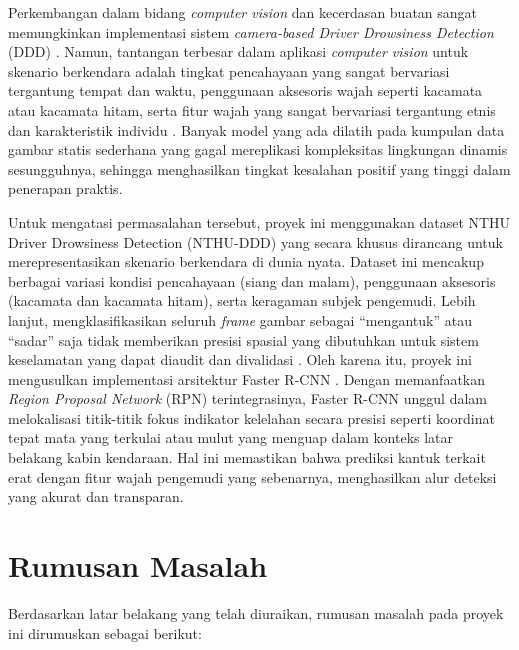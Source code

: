 \documentclass[11pt,a4paper,oneside]{report}
\begin{document}
Perkembangan dalam bidang \textit{computer vision} dan kecerdasan buatan sangat memungkinkan implementasi sistem \textit{camera-based Driver Drowsiness Detection} (DDD) \cite{deng2019deep, ed2020deep}. Namun, tantangan terbesar dalam aplikasi \textit{computer vision} untuk skenario berkendara adalah tingkat pencahayaan yang sangat bervariasi tergantung tempat dan waktu, penggunaan aksesoris wajah seperti kacamata atau kacamata hitam, serta fitur wajah yang sangat bervariasi tergantung etnis dan karakteristik individu \cite{abbas2024ddd}. Banyak model yang ada dilatih pada kumpulan data gambar statis sederhana yang gagal mereplikasi kompleksitas lingkungan dinamis sesungguhnya, sehingga menghasilkan tingkat kesalahan positif yang tinggi dalam penerapan praktis.

Untuk mengatasi permasalahan tersebut, proyek ini menggunakan dataset NTHU Driver Drowsiness Detection (NTHU-DDD) \cite{weng2017driver} yang secara khusus dirancang untuk merepresentasikan skenario berkendara di dunia nyata. Dataset ini mencakup berbagai variasi kondisi pencahayaan (siang dan malam), penggunaan aksesoris (kacamata dan kacamata hitam), serta keragaman subjek pengemudi. Lebih lanjut, mengklasifikasikan seluruh \textit{frame} gambar sebagai ``mengantuk'' atau ``sadar'' saja tidak memberikan presisi spasial yang dibutuhkan untuk sistem keselamatan yang dapat diaudit dan divalidasi \cite{ma2024hybrid}. Oleh karena itu, proyek ini mengusulkan implementasi arsitektur Faster R-CNN \cite{ren2015faster}. Dengan memanfaatkan \textit{Region Proposal Network} (RPN) terintegrasinya, Faster R-CNN unggul dalam melokalisasi titik-titik fokus indikator kelelahan secara presisi seperti koordinat tepat mata yang terkulai atau mulut yang menguap dalam konteks latar belakang kabin kendaraan. Hal ini memastikan bahwa prediksi kantuk terkait erat dengan fitur wajah pengemudi yang sebenarnya, menghasilkan alur deteksi yang akurat dan transparan.

\section{Rumusan Masalah}

Berdasarkan latar belakang yang telah diuraikan, rumusan masalah pada proyek ini dirumuskan sebagai berikut:
\end{document}

